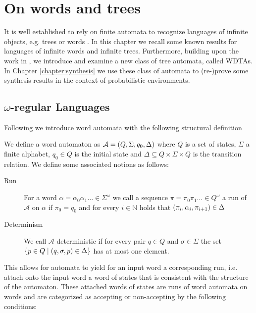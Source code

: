 \chapter{On words and trees}
It is well established to rely on finite automata to recognize languages of
infinite objects, e.g. trees or words \cite{LangAutoLog}. In this chapter we
recall some known results for languages of infinite words and infinite trees.
Furthermore, building upon the work in \cite{RandAutoInfTrees}, we introduce
and examine a new class of tree automata, called \aclp{WDTA}. In Chapter
\ref{chapter:synthesis} we use these class of automata to (re-)prove some
synthesis results in the context of probabilistic environments.

\section{$\omega$-regular Languages}
\label{sec:wordautomata}
Following \cite{LangAutoLog} we introduce word automata with the following
structural definition
\begin{definition}
  We define a word automaton as
  $\mathcal{A} = \left(Q, \Sigma, q_{0}, \Delta\right)$ where
  $Q$ is a set of states, $\Sigma$ a finite alphabet, $q_{0}\in Q$ is the
  initial state and $\Delta\subseteq Q\times\Sigma\times Q$ is the transition
  relation. We define some associated notions as follows:
  \begin{description}
    \item [Run]
      For a word $\alpha = \alpha_{0}\alpha_{1}\dots\in\Sigma^{\omega}$ we call
      a sequence $\pi = \pi_{0}\pi_{1}\dots \in Q^{\omega}$ a run of
      $\mathcal{A}$ on $\alpha$ if $\pi_{0} = q_{0}$ and for every
      $i\in\mathbb{N}$ holds that
      $\left(\pi_{i}, \alpha_{i}, \pi_{i+1}\right)\in\Delta$
    \item [Determinism]
      We call $\mathcal{A}$ deterministic if for every pair $q\in Q$ and
      $\sigma\in\Sigma$ the set
      $\left\{p\in Q\mid\left(q,\sigma,p\right)\in\Delta\right\}$ has at most one
      element.
  \end{description}
\end{definition}
This allows for automata to yield for an input word a corresponding run, i.e.
attach onto the input word a word of states that is consistent with the
structure of the automaton. These attached words of states are runs of word
automata on words and are categorized as accepting or non-accepting by the
following conditions:
